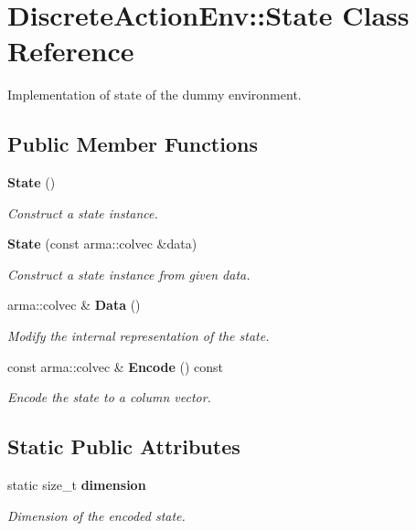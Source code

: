 \section{Discrete\+Action\+Env\+:\+:State Class Reference}
\label{classmlpack_1_1rl_1_1DiscreteActionEnv_1_1State}


Implementation of state of the dummy environment.  


\subsection*{Public Member Functions}
\begin{DoxyCompactItemize}
\item 
\textbf{ State} ()
\begin{DoxyCompactList}\small\item\em Construct a state instance. \end{DoxyCompactList}\item 
\textbf{ State} (const arma\+::colvec \&data)
\begin{DoxyCompactList}\small\item\em Construct a state instance from given data. \end{DoxyCompactList}\item 
arma\+::colvec \& \textbf{ Data} ()
\begin{DoxyCompactList}\small\item\em Modify the internal representation of the state. \end{DoxyCompactList}\item 
const arma\+::colvec \& \textbf{ Encode} () const
\begin{DoxyCompactList}\small\item\em Encode the state to a column vector. \end{DoxyCompactList}\end{DoxyCompactItemize}
\subsection*{Static Public Attributes}
\begin{DoxyCompactItemize}
\item 
static size\+\_\+t \textbf{ dimension}
\begin{DoxyCompactList}\small\item\em Dimension of the encoded state. \end{DoxyCompactList}\end{DoxyCompactItemize}


